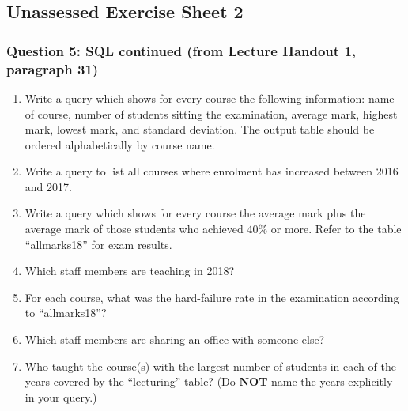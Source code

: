 \subsection{Unassessed Exercise Sheet 2}
\subsubsection{Question 5: SQL continued (from Lecture Handout 1, paragraph 31)}
\begin{enumerate}
    \item[a.] Write a query which shows for every course the following information: name of course, number of students sitting the examination, average mark, highest mark, lowest mark, and standard deviation. The output table should be ordered alphabetically by course name.
    \item[b.] Write a query to list all courses where enrolment has increased between 2016 and 2017.
    \item[c.] Write a query which shows for every course the average mark plus the average mark of those students who achieved 40\% or more. Refer to the table “allmarks18” for exam results.
    \item[d.] Which staff members are teaching in 2018?
    \item[e.] For each course, what was the hard-failure rate in the examination according to “allmarks18”?
    \item[f.] Which staff members are sharing an office with someone else?
    \item[g.] Who taught the course(s) with the largest number of students in each of the years covered by the “lecturing” table? (Do \textbf{NOT} name the years explicitly in your query.)
\end{enumerate}

